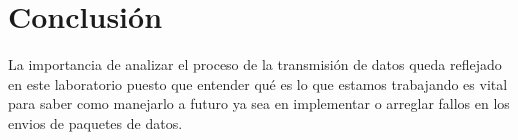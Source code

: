 \documentclass{article}
\begin{document}
\section{Conclusión \vspace{0.5cm}}
La importancia de analizar el proceso de la transmisión de datos queda reflejado en este laboratorio puesto que entender qué es lo que estamos trabajando es vital para saber como manejarlo a futuro ya sea en implementar o arreglar fallos en los envios de paquetes de datos.
\end{document}
